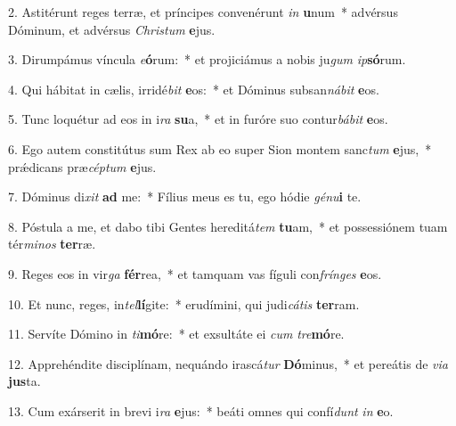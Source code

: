 2. Astitérunt reges terræ, et príncipes convenérunt \textit{in} \textbf{u}num~*  advérsus Dóminum, et advérsus \textit{Chris}\textit{tum} \textbf{e}jus.\

3. Dirumpámus víncula \textit{e}\textbf{ó}rum:~*  et projiciámus a nobis ju\textit{gum} \textit{ip}\textbf{só}rum.\

4. Qui hábitat in cælis, irridé\textit{bit} \textbf{e}os:~*  et Dóminus subsan\textit{ná}\textit{bit} \textbf{e}os.\

5. Tunc loquétur ad eos in i\textit{ra} \textbf{su}a,~*  et in furóre suo contur\textit{bá}\textit{bit} \textbf{e}os.\

6. Ego autem constitútus sum Rex ab eo super Sion montem sanc\textit{tum} \textbf{e}jus,~*  prǽdicans præ\textit{cép}\textit{tum} \textbf{e}jus.\

7. Dóminus di\textit{xit} \textbf{ad} me:~*  Fílius meus es tu, ego hódie \textit{gé}\textit{nu}\textbf{i} te.\

8. Póstula a me, et dabo tibi Gentes hereditá\textit{tem} \textbf{tu}am,~*  et possessiónem tuam tér\textit{mi}\textit{nos} \textbf{ter}ræ.\

9. Reges eos in vir\textit{ga} \textbf{fér}rea,~*  et tamquam vas fíguli con\textit{frín}\textit{ges} \textbf{e}os.\

10. Et nunc, reges, in\textit{tel}\textbf{lí}gite:~*  erudímini, qui judi\textit{cá}\textit{tis} \textbf{ter}ram.\

11. Servíte Dómino in \textit{ti}\textbf{mó}re:~*  et exsultáte ei \textit{cum} \textit{tre}\textbf{mó}re.\

12. Apprehéndite disciplínam, nequándo irascá\textit{tur} \textbf{Dó}minus,~*  et pereátis de \textit{vi}\textit{a} \textbf{jus}ta.\

13. Cum exárserit in brevi i\textit{ra} \textbf{e}jus:~*  beáti omnes qui confí\textit{dunt} \textit{in} \textbf{e}o.\

